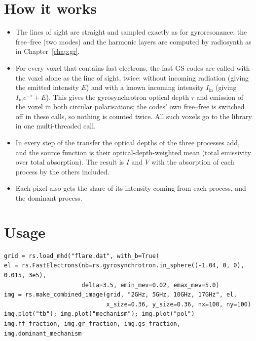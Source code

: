 \section{How it works}
\begin{itemize}[itemsep=2pt]
\item The lines of sight are straight and sampled exactly as for gyroresonance; the
  free--free (two modes) and the harmonic layers are computed by radiosynth as in
  Chapter~\ref{chap:gr}.
\item For every voxel that contains fast electrons, the fast GS codes are called with the
  voxel alone as the line of sight, twice: without incoming radiation (giving the emitted
  intensity $E$) and with a known incoming intensity $I_\text{in}$ (giving
  $I_\text{in}e^{-\tau}+E$). This gives the gyrosynchrotron optical depth $\tau$ and
  emission of the voxel in both circular polarisations; the codes' own free--free is
  switched off in these calls, so nothing is counted twice. All such voxels go to the
  library in one multi-threaded call.
\item In every step of the transfer the optical depths of the three processes add, and the
  source function is their optical-depth-weighted mean (total emissivity over total
  absorption). The result is $I$ and $V$ with the absorption of each process by the others
  included.
\item Each pixel also gets the share of its intensity coming from each process, and the
  dominant process.
\end{itemize}

\section{Usage}
\begin{lstlisting}[style=pyex]
grid = rs.load_mhd("flare.dat", with_b=True)
el = rs.FastElectrons(nb=rs.gyrosynchrotron.in_sphere((-1.04, 0, 0), 0.015, 3e5),
                      delta=3.5, emin_mev=0.02, emax_mev=5.0)
img = rs.make_combined_image(grid, "2GHz, 5GHz, 10GHz, 17GHz", el,
                             x_size=0.36, y_size=0.36, nx=100, ny=100)
img.plot("tb"); img.plot("mechanism"); img.plot("pol")
img.ff_fraction, img.gr_fraction, img.gs_fraction, img.dominant_mechanism
\end{lstlisting}

